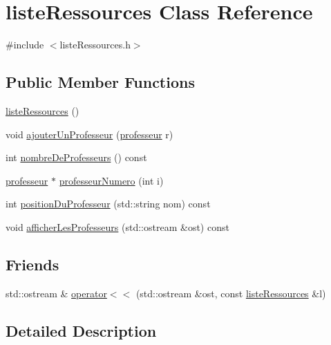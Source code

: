 \hypertarget{classliste_ressources}{}\section{liste\+Ressources Class Reference}
\label{classliste_ressources}


{\ttfamily \#include $<$liste\+Ressources.\+h$>$}

\subsection*{Public Member Functions}
\begin{DoxyCompactItemize}
\item 
\hyperlink{classliste_ressources_a3f49a0916898d200295e0e6593253e73}{liste\+Ressources} ()
\item 
void \hyperlink{classliste_ressources_afb8d1bb96971684ed945622b462fcd5d}{ajouter\+Un\+Professeur} (\hyperlink{classprofesseur}{professeur} r)
\item 
int \hyperlink{classliste_ressources_a9b496a36a9651347734d7895397dde00}{nombre\+De\+Professeurs} () const
\item 
\hyperlink{classprofesseur}{professeur} $\ast$ \hyperlink{classliste_ressources_acd47bea2a7105b73adcf0891b82d2e1c}{professeur\+Numero} (int i)
\item 
int \hyperlink{classliste_ressources_a1ba16dd4280006301dc94d467b9dddaa}{position\+Du\+Professeur} (std\+::string nom) const
\item 
void \hyperlink{classliste_ressources_a8459ff3010ad07d1ec5b23d73fad6911}{afficher\+Les\+Professeurs} (std\+::ostream \&ost) const
\end{DoxyCompactItemize}
\subsection*{Friends}
\begin{DoxyCompactItemize}
\item 
std\+::ostream \& \hyperlink{classliste_ressources_ad87802e9dc9dc83dfe95474945063d24}{operator$<$$<$} (std\+::ostream \&ost, const \hyperlink{classliste_ressources}{liste\+Ressources} \&l)
\end{DoxyCompactItemize}


\subsection{Detailed Description}


